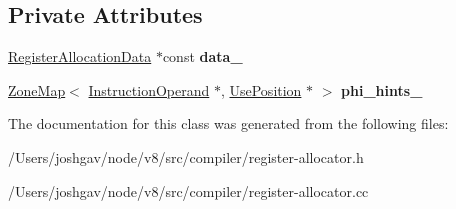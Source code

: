 \subsection*{Private Attributes}
\begin{DoxyCompactItemize}
\item 
\hyperlink{classv8_1_1internal_1_1compiler_1_1_register_allocation_data}{Register\+Allocation\+Data} $\ast$const {\bfseries data\+\_\+}\hypertarget{classv8_1_1internal_1_1compiler_1_1_live_range_builder_af8d2bdb278d80bd0a8c050567aa95018}{}\label{classv8_1_1internal_1_1compiler_1_1_live_range_builder_af8d2bdb278d80bd0a8c050567aa95018}

\item 
\hyperlink{classv8_1_1internal_1_1_zone_map}{Zone\+Map}$<$ \hyperlink{classv8_1_1internal_1_1compiler_1_1_instruction_operand}{Instruction\+Operand} $\ast$, \hyperlink{classv8_1_1internal_1_1compiler_1_1_use_position}{Use\+Position} $\ast$ $>$ {\bfseries phi\+\_\+hints\+\_\+}\hypertarget{classv8_1_1internal_1_1compiler_1_1_live_range_builder_afa05c875c8241efcde8df9b52d0a91b3}{}\label{classv8_1_1internal_1_1compiler_1_1_live_range_builder_afa05c875c8241efcde8df9b52d0a91b3}

\end{DoxyCompactItemize}


The documentation for this class was generated from the following files\+:\begin{DoxyCompactItemize}
\item 
/\+Users/joshgav/node/v8/src/compiler/register-\/allocator.\+h\item 
/\+Users/joshgav/node/v8/src/compiler/register-\/allocator.\+cc\end{DoxyCompactItemize}

